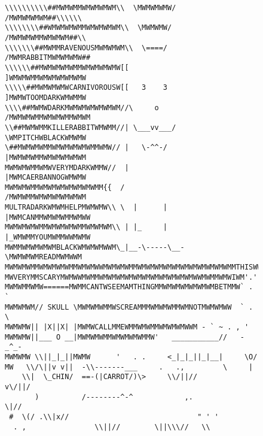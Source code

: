 \documentclass{metanorma}
\begin{document}
\begin{figure}[h]
\begin{verbatim}
\\\\\\\\\\##MWMWMMWMWMWMWM\\  \MWMWMWMW/  /MWMWMWMWM##\\\\\\
\\\\\\\\##WMWMWMWMMWMWMWMWM\\  \MWMWMW/  /MWMWMWMMWMWMWM##\\
\\\\\\\##MWMMRAVENOUSMWMWMWM\\  \====/  /MWMRABBITMWMWMWMW##
\\\\\\##MWMWMWMWMMWMWMWMWMW[[            ]WMWMWMMWMWMWMWMWMW
\\\\\##MWMWMWMWCARNIVOROUSW[[   3    3   ]MWMWTOOMDARKWMWMMW
\\\\##MWMWDARKMWMWMWMWMWMWM//\     o    /MWMWMWMMWMWMWMMWMWM
\\##MWMWMMKILLERABBITWMWMM//| \___vv___/ \WMPITCHWBLACKWMWMW
\##MWMWMWMMWMWMWMWMWMMWMW// |   \-^^-/   |MWMWMWMMWMWMWMWMWM
MWMWMWMMWMWVERYMDARKWMMW//  |            |MWMCAERBANNOGWMWMW
MWMWMWMMWMWMWMWMWMWMWMM{{  /             /MWMWMMWMWMWMWMWMWM
MULTRADARKWMWMHELPMWMWMW\\ \  |      |  |MWMCANMMWMWMWMMWMWW
MWMWMWMWMMWMWMWMWMMWMWMWM\\ | |_     |  |_WMWMMYOUMWMMWWMWMW
MWMMWMWMWMWMBLACKWMWMWMWWM\_|__-\-----\__-\MWMWMWMREADMWMWWM
MWMWMWMMWMWMWMWMMWMWMWWMWMWMWMMWMWMWMWMWMWMWMWMWMWMWMMTHISWW
MWVERYMMSCARYMWMWWMWMMWMWMWMWMWMWMWMWMWMWMWMWWMWMMWMWIWM'.',
MWMWMMWMW======MWMMCANTWSEEMAMTHINGMMWMWMWMWMWMWMBETMMW` . `
MWMWMWM// SKULL \MWMWMWMMWSCREAMMMWMWMWMMWMNOTMWMWMWW  ` . \
MWMWMW|| |X||X| |MWMWCALLMMEWMMWMWMMWMWMWMWWM - ` ~ . , '
MWMWMW||___ O __|MWMWMWMMWMWMWMWMMW'   ___________//   -_^_-
MWMWMW \\||_|_||MWMW      '   . .     <_|_|_||_|__|     \O/
MW   \\/\||v v||  -\\-------___     .   .,         \     |
    \\|  \_CHIN/  ==-(|CARROT/)\>     \\/||//         v\/||/
       )          /--------^-^            ,.            \|//
 #  \(/ .\\|x//                              " ' '
  . ,                \\||//        \||\\\//   \\
\end{verbatim}

\end{figure}
\end{document}
